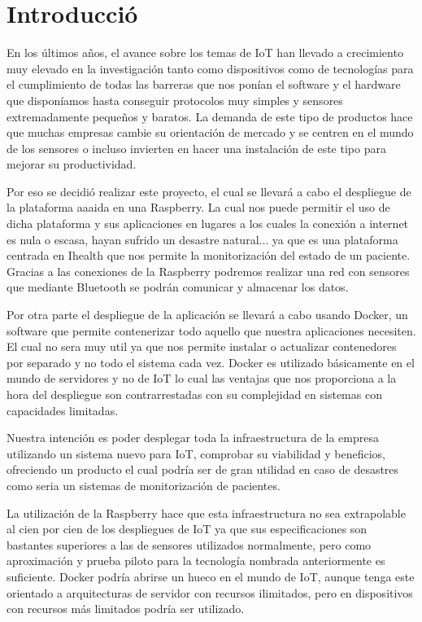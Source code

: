 \cleardoublepage
{}
\chapter*{Introducció}
En los últimos años, el avance sobre los temas de IoT han llevado a crecimiento muy elevado en la investigación tanto como dispositivos como de tecnologías para el cumplimiento de todas las barreras que nos ponían el software y el hardware que disponíamos hasta conseguir protocolos muy simples y sensores extremadamente pequeños y baratos. La demanda de este tipo de productos hace que muchas empresas cambie su orientación de mercado y se centren en el mundo de los sensores o incluso invierten en hacer una instalación de este tipo para mejorar su productividad. 

Por eso se decidió realizar este proyecto, el cual se llevará a cabo el despliegue de la plataforma aaaida en una Raspberry. La cual nos puede permitir el uso de dicha plataforma y sus aplicaciones en lugares a los cuales la conexión a internet es nula o escasa, hayan sufrido un desastre natural... ya que es una plataforma centrada en Ihealth que nos permite la monitorización del estado de un paciente.
Gracias a las conexiones de la Raspberry podremos realizar una red con sensores que mediante Bluetooth se podrán comunicar y almacenar los datos. 

Por otra parte el despliegue de la aplicación se llevará a cabo usando Docker, un software que permite contenerizar todo aquello que nuestra aplicaciones necesiten. El cual no sera muy util ya que nos permite instalar o actualizar contenedores por separado y no todo el sistema cada vez. Docker es utilizado básicamente en el mundo de servidores y no de IoT lo cual las ventajas que nos proporciona a la hora del despliegue son contrarrestadas con su complejidad en sistemas con capacidades limitadas.

Nuestra intención es poder desplegar toda la infraestructura de la empresa utilizando un sistema nuevo para IoT, comprobar su viabilidad y beneficios, ofreciendo un producto el cual podría ser de gran utilidad en caso de desastres como seria un sistemas de monitorización de pacientes. 

La utilización de la Raspberry hace que esta infraestructura no sea extrapolable al cien por cien de los despliegues de IoT ya que sus especificaciones son bastantes superiores a las de sensores utilizados normalmente, pero como aproximación y prueba piloto para  la tecnología nombrada anteriormente es suficiente. Docker podría abrirse un hueco en el mundo de IoT, aunque tenga este orientado a arquitecturas de servidor con recursos ilimitados, pero en dispositivos con recursos más limitados podría ser utilizado.  
